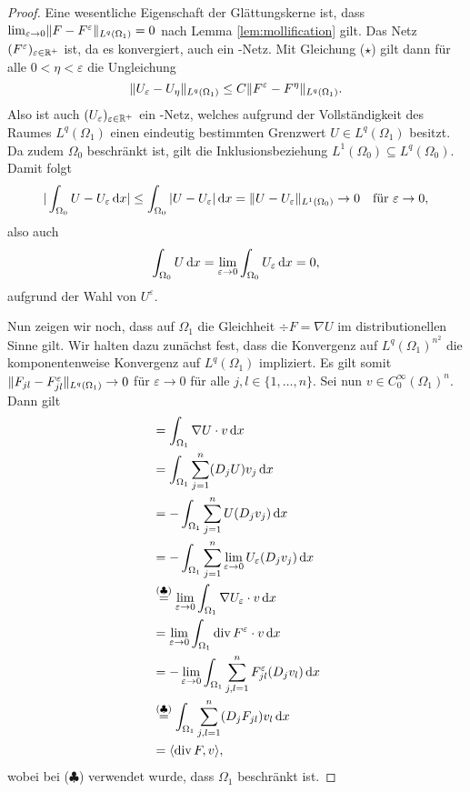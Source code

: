 \begin{proof}
  Eine wesentliche Eigenschaft der Glättungskerne ist, dass $\lim_{\varepsilon \to 0} \lVert F - F^\varepsilon \rVert_{L^q(\Omega_1)} = 0$ nach Lemma \ref{lem:mollification} gilt.
  Das Netz $(F^\varepsilon)_{\varepsilon \in \mathbb{R}^+}$ ist, da es konvergiert, auch ein \cauchy-Netz.
  Mit Gleichung ($\star$) gilt dann für alle $0 < \eta < \varepsilon$ die Ungleichung
  $$
    \lVert U_\varepsilon - U_\eta \rVert_{L^q(\Omega_1)}
    \leq C \lVert F^\varepsilon - F^\eta \rVert_{L^q(\Omega_1)}.
  $$
  Also ist auch $(U_\varepsilon)_{\varepsilon \in \mathbb{R}^+}$ ein \cauchy-Netz, welches aufgrund der Vollständigkeit des Raumes $L^q(\Omega_1)$ einen eindeutig bestimmten Grenzwert $U \in L^q(\Omega_1)$ besitzt.
  Da zudem $\Omega_0$ beschränkt ist, gilt die Inklusionsbeziehung $L^1(\Omega_0) \subseteq L^q(\Omega_0)$.
  Damit folgt
  $$
    | \int_{\Omega_0} U - U_\varepsilon \, {\operatorname{d}\!{x}} |
    \leq  \int_{\Omega_0} | U - U_\varepsilon | \, {\operatorname{d}\!{x}} 
    = \lVert U - U_\varepsilon \rVert_{L^1(\Omega_0)} 
    \to 0 \quad\text{für } \varepsilon \to 0,
  $$
  also auch
  $$
    \int_{\Omega_0} U \, {\operatorname{d}\!{x}} = \lim_{\varepsilon \to 0} \int_{\Omega_0} U_\varepsilon \, {\operatorname{d}\!{x}} =  0,
  $$
  aufgrund der Wahl von $U^\varepsilon$.

  Nun zeigen wir noch, dass auf $\Omega_1$ die Gleichheit $\div F = \nabla U$ im distributionellen Sinne gilt. 
  Wir halten dazu zunächst fest, dass die Konvergenz auf $L^q(\Omega_1)^{n^2}$ die komponentenweise Konvergenz auf $L^q(\Omega_1)$ impliziert.
  Es gilt somit $\lVert F_{jl} - F_{jl}^\varepsilon \rVert_{L^q(\Omega_1)} \to 0$ für $\varepsilon \to 0$ für alle $j,l \in \{ 1,\dots,n\}$.
  Sei nun $v \in C_0^\infty(\Omega_1)^n$.
  Dann gilt
  \begin{align*}
    [\nabla U, v]
    &= \int_{\Omega_1} \nabla U \cdot v \d x \\
    &= \int_{\Omega_1} \sum_{j = 1}^n (D_j U) v_j \d x \\
    &= -\int_{\Omega_1} \sum_{j = 1}^n U (D_j v_j) \d x \\ 
    &= -\int_{\Omega_1} \sum_{j = 1}^n \lim_{\varepsilon \to 0} U_\varepsilon (D_j v_j) \d x \\
    &\overset{(\clubsuit)}{=} \lim_{\varepsilon \to 0} \int_{\Omega_1} \nabla U_\varepsilon \cdot v \d x \\
    &= \lim_{\varepsilon \to 0} \int_{\Omega_1} \div F^\varepsilon \cdot v \d x \\
    &= -\lim_{\varepsilon \to 0} \int_{\Omega_1} \sum_{j,l=1}^n F_{jl}^\varepsilon (D_j v_l) \d x \\
    &\overset{(\clubsuit)}{=} \int_{\Omega_1} \sum_{j,l=1}^n (D_j F_{jl}) v_l \d x \\
    &= \langle \div F, v \rangle,
  \end{align*}
  wobei bei ($\clubsuit$) verwendet wurde, dass $\Omega_1$ beschränkt ist.


\end{proof}

